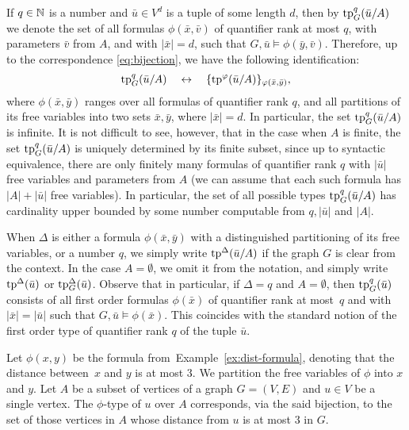 If $q\in \mathbb{N}$ is a number and $\bar u\in  V^{d}$
is a tuple of some length $d$, then by $\mathrm{tp}^q_G(\bar u/A)$  we denote the set of all formulas $\phi(\bar x,\bar v)$
of quantifier rank at most $q$, with parameters $\bar v$ from $A$, and with $|\bar x|=d$,
such that $G,\bar u\models \phi(\bar y,\bar v)$.
Therefore, up to the correspondence \eqref{eq:bijection}, we have the following identification:
\begin{equation*}
\mathrm{tp}^q_G(\bar u/A)\quad\leftrightarrow\quad\{\mathrm{tp}^\varphi(\bar u/A)\}_{\varphi(\bar x,\bar y)},
\end{equation*}
where $\phi(\bar x,\bar y)$ ranges over all formulas of quantifier rank $q$, and all partitions of its free variables into two sets $\bar x,\bar y$,
where $|\bar x|=d$. 
In particular, the set $\mathrm{tp}^q_G(\bar u/A)$ is infinite.
It is not difficult to see, however, that in the case when $A$ is finite,
the set $\mathrm{tp}^q_G(\bar u/A)$ is uniquely determined by its finite subset, since up to syntactic equivalence, 
there are only finitely many formulas of quantifier rank $q$ with $|\bar u|$ free variables and parameters from $A$
(we can assume that each such formula has $|A|+|\bar u|$ free variables).
In particular, the set of all possible types 
$\mathrm{tp}^q_G(\bar u/A)$ has cardinality upper bounded by some number 
 computable from $q,|\bar u|$ and $|A|$.

When $\Delta$ is either a formula $\phi(\bar x,\bar y)$ with a distinguished partitioning of its free variables, or a number $q$,
we simply write $\mathrm{tp}^\Delta(\bar u/A)$ if the graph $G$
is clear from the context.
In the case $A=\emptyset$, we omit it from the notation, 
and simply write $\mathrm{tp}^\Delta(\bar u)$ or $\mathrm{tp}^\Delta_G(\bar u)$.
Observe that in particular, if $\Delta=q$ and $A=\emptyset$, then $\mathrm{tp}^q_G(\bar u)$ consists of all first order formulas $\phi(\bar x)$ of quantifier rank at most~$q$ and with $|\bar x|=|\bar u|$
such that $G,\bar u\models \phi(\bar x)$. This coincides with the standard notion of the first order type of quantifier rank $q$ of the tuple $\bar u$.

\begin{example}
Let $\phi(x,y)$	be the formula from~Example~\ref{ex:dist-formula}, denoting that the distance between~$x$ and $y$ is at most $3$.
We  partition  the free variables of $\phi$
into $x$ and $y$.
Let $A$ be a subset of vertices of a graph $G=(V,E)$
and $u\in V$ be a single vertex.
The $\phi$-type of $u$ over $A$
corresponds, via the said bijection, to the set of those vertices in $A$
whose distance from $u$ is at most $3$ in $G$.
\end{example}

